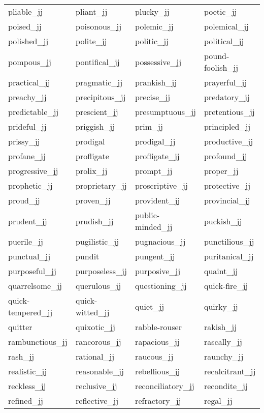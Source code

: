 \begin{longtable}[!htbp]{| llll |}
   pliable\_jj & pliant\_jj & plucky\_jj & poetic\_jj \\
   poised\_jj & poisonous\_jj & polemic\_jj & polemical\_jj \\
   polished\_jj & polite\_jj & politic\_jj & political\_jj \\
   pompous\_jj & pontifical\_jj & possessive\_jj & pound-foolish\_jj \\
   practical\_jj & pragmatic\_jj & prankish\_jj & prayerful\_jj \\
   preachy\_jj & precipitous\_jj & precise\_jj & predatory\_jj \\
   predictable\_jj & prescient\_jj & presumptuous\_jj & pretentious\_jj \\
   prideful\_jj & priggish\_jj & prim\_jj & principled\_jj \\
   prissy\_jj & prodigal & prodigal\_jj & productive\_jj \\
   profane\_jj & profligate & profligate\_jj & profound\_jj \\
   progressive\_jj & prolix\_jj & prompt\_jj & proper\_jj \\
   prophetic\_jj & proprietary\_jj & proscriptive\_jj & protective\_jj \\
   proud\_jj & proven\_jj & provident\_jj & provincial\_jj \\
   prudent\_jj & prudish\_jj & public-minded\_jj & puckish\_jj \\
   puerile\_jj & pugilistic\_jj & pugnacious\_jj & punctilious\_jj \\
   punctual\_jj & pundit & pungent\_jj & puritanical\_jj \\
   purposeful\_jj & purposeless\_jj & purposive\_jj & quaint\_jj \\
   quarrelsome\_jj & querulous\_jj & questioning\_jj & quick-fire\_jj \\
   quick-tempered\_jj & quick-witted\_jj & quiet\_jj & quirky\_jj \\
   quitter & quixotic\_jj & rabble-rouser & rakish\_jj \\
   rambunctious\_jj & rancorous\_jj & rapacious\_jj & rascally\_jj \\
   rash\_jj & rational\_jj & raucous\_jj & raunchy\_jj \\
   realistic\_jj & reasonable\_jj & rebellious\_jj & recalcitrant\_jj \\
   reckless\_jj & reclusive\_jj & reconciliatory\_jj & recondite\_jj \\
   refined\_jj & reflective\_jj & refractory\_jj & regal\_jj \\

\end{longtable}
